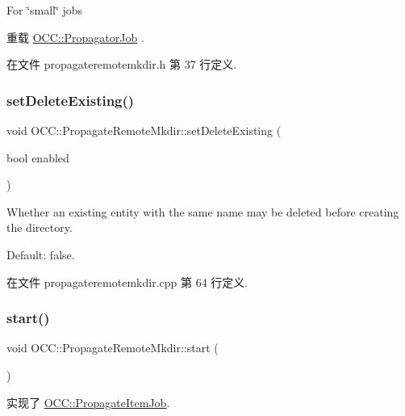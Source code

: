 For \char`\"{}small\char`\"{} jobs 

重载 \hyperlink{class_o_c_c_1_1_propagator_job_a1272ff804d4daf4798f08af6f654944d}{O\+C\+C\+::\+Propagator\+Job} .



在文件 propagateremotemkdir.\+h 第 37 行定义.

\mbox{\label{class_o_c_c_1_1_propagate_remote_mkdir_a625d3807bca26958611f898f5637ee0f}} 
\subsubsection{\texorpdfstring{set\+Delete\+Existing()}{setDeleteExisting()}}
{\footnotesize\ttfamily void O\+C\+C\+::\+Propagate\+Remote\+Mkdir\+::set\+Delete\+Existing (\begin{DoxyParamCaption}\item[{bool}]{enabled }\end{DoxyParamCaption})}

Whether an existing entity with the same name may be deleted before creating the directory.

Default\+: false. 

在文件 propagateremotemkdir.\+cpp 第 64 行定义.

\mbox{\label{class_o_c_c_1_1_propagate_remote_mkdir_a9bc9722b6554147bdb84d65effe15dee}} 
\subsubsection{\texorpdfstring{start()}{start()}}
{\footnotesize\ttfamily void O\+C\+C\+::\+Propagate\+Remote\+Mkdir\+::start (\begin{DoxyParamCaption}{ }\end{DoxyParamCaption})\hspace{0.3cm}{\ttfamily [virtual]}}



实现了 \hyperlink{class_o_c_c_1_1_propagate_item_job_a97e7a37e51ad1696f6590dd52080f10a}{O\+C\+C\+::\+Propagate\+Item\+Job}.



